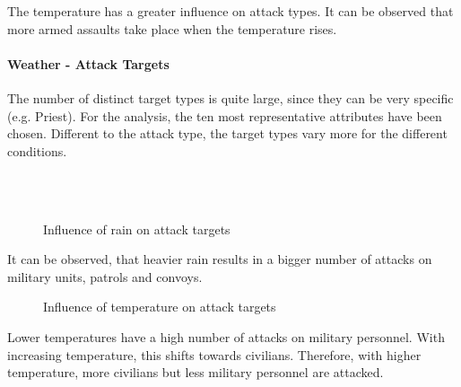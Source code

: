 The temperature has a greater influence on attack types. It can be observed that more armed assaults take place when the temperature rises.

\newpage

\paragraph{Weather - Attack Targets}
The number of distinct target types is quite large, since they can be very specific (e.g. Priest). For the analysis, the ten most representative attributes have been chosen. Different to the attack type, the target types vary more for the different conditions.

\begin{figure}[!ht]
\centering
    \qquad\\
    \qquad
    \qquad\\
    \qquad
\caption{Influence of rain on attack targets}
\end{figure}

It can be observed, that heavier rain results in a bigger number of attacks on military units, patrols and convoys.


\newpage

\begin{figure}[!ht]
\centering
    \qquad
    \qquad
    \qquad
    \qquad
    \qquad
\caption{Influence of temperature on attack targets}
\label{fig:example subfigure}
\end{figure}

Lower temperatures have a high number of attacks on military personnel. With increasing temperature, this shifts towards civilians. Therefore, with higher temperature, more civilians but less military personnel are attacked. 

